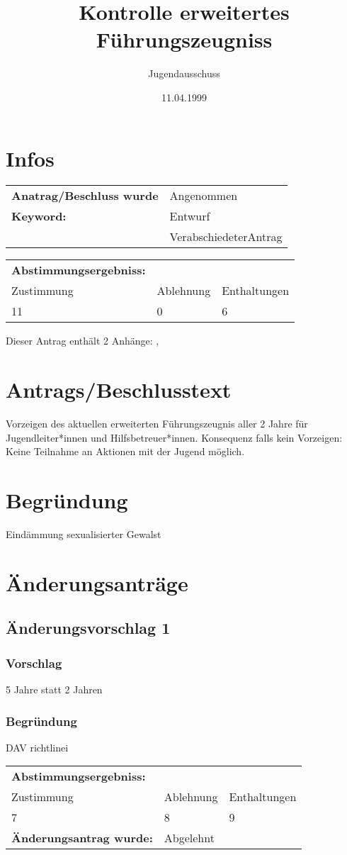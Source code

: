 \documentclass[12pt,a4paper]{scrartcl}
\begin{document}
\title{Kontrolle erweitertes Führungszeugniss}
\author{Jugendausschuss}
\date{11.04.1999}
\maketitle
\section{Infos}
\begin{tabularx}{\linewidth}{@{}lX}
\textbf{Anatrag/Beschluss wurde} & Angenommen\\
\textbf{Keyword:} & Entwurf\\
 & VerabschiedeterAntrag\\
\end{tabularx}
\begin{tabularx}{\linewidth}{@{}XXX}
\textbf{Abstimmungsergebniss:}&&\\
Zustimmung & Ablehnung & Enthaltungen \\
11 & 0 & 6 \\
\end{tabularx}\vspace{1.5ex} 
 Dieser Antrag enthält 2 Anhänge: ,  
\section{Antrags/Beschlusstext}
Vorzeigen des aktuellen erweiterten Führungszeugnis aller 2 Jahre für Jugendleiter*innen und Hilfsbetreuer*innen. Konsequenz falls kein Vorzeigen: Keine Teilnahme an Aktionen mit der Jugend möglich.
\section{Begründung}
Eindämmung sexualisierter Gewalst
\section{Änderungsanträge}
\subsection{Änderungsvorschlag 1}
\subsubsection*{Vorschlag}
5 Jahre statt 2 Jahren
\subsubsection*{Begründung}
DAV richtlinei\vspace{1.5ex} \\
\begin{tabularx}{\linewidth}{@{}XXX}
\textbf{Abstimmungsergebniss:}&&\\
Zustimmung & Ablehnung & Enthaltungen \\
7 & 8 & 9 \\
\multicolumn{@{}2}{l}{\textbf{Änderungsantrag wurde:}} & Abgelehnt \\
\end{tabularx}
\end{document}
